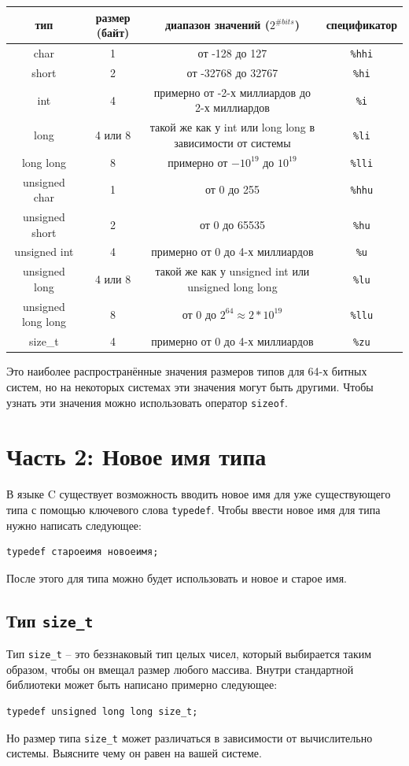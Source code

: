 \documentclass{article}
\begin{document}
\begin{center}
\begin{tabular}{ c c c c }
 тип & размер (байт) & диапазон значений ($2^{\# bits}$) & спецификатор \\ \hline
 char & 1 & от -128 до 127 & \texttt{\%hhi} \\ 
 short & 2 & от -32768 до 32767 & \texttt{\%hi}  \\  
 int & 4 & примерно от -2-х миллиардов до 2-х миллиардов & \texttt{\%i}  \\  
 long & 4 или 8 & такой же как у int или long long в зависимости от системы & \texttt{\%li}  \\  
 long long & 8 & примерно от $-10^{19}$ до $10^{19}$ & \texttt{\%lli}  \\  
 unsigned char & 1 & от 0 до 255 & \texttt{\%hhu} \\ 
 unsigned short & 2 & от 0 до 65535 & \texttt{\%hu}  \\  
 unsigned int & 4 & примерно от 0 до 4-х миллиардов & \texttt{\%u}  \\  
 unsigned long & 4 или 8 & такой же как у unsigned int или unsigned long long & \texttt{\%lu}  \\  
 unsigned long long & 8 & от 0 до $2^{64} \approx 2*10^{19}$  & \texttt{\%llu}  \\  
 size\_t & 4 & примерно от 0 до 4-х миллиардов & \texttt{\%zu} \\ \hline 
\end{tabular}
\end{center}
Это наиболее распространённые значения размеров типов для 64-х битных систем, но на некоторых системах эти значения могут быть другими.
Чтобы узнать эти значения можно использовать оператор \texttt{sizeof}. \\

\section*{Часть 2: Новое имя типа}
В языке C существует возможность вводить новое имя для уже существующего типа с помощью ключевого слова \texttt{typedef}. Чтобы ввести новое имя для типа нужно написать следующее:
\begin{lstlisting}
typedef староеимя новоеимя;
\end{lstlisting}
После этого для типа можно будет использовать и новое и старое имя.


\subsection*{Тип \texttt{size\_t}} 
Тип \texttt{size\_t} -- это беззнаковый тип целых чисел, который выбирается таким образом, чтобы он вмещал размер любого массива. Внутри стандартной библиотеки может быть написано примерно следующее:
\begin{lstlisting}
typedef unsigned long long size_t;
\end{lstlisting}
Но размер типа \texttt{size\_t} может различаться в зависимости от вычислительно системы. Выясните чему он равен на вашей системе.
\end{document}
